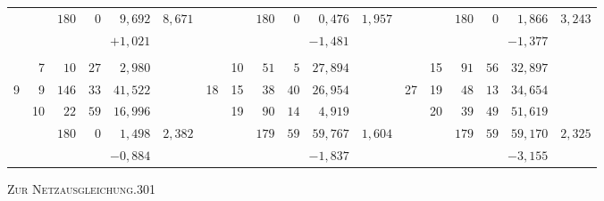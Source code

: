 \begin{center}
\begin{tabular}{|r|r|r@{\;}r@{\;}r|r||r|r|r@{\;}r@{\;}r|r||r|r|r@{\;}r@{\;}r|r|}
 & \llap{\raisebox{.5ex}{.}\hspace{.4em}} & $180$ & $0$ & $9{,}692$ & $8{,}671$ &  &  & $180$ & $0$ & $0{,}476$ & $1{,}957$ &  &  & $180$ & $0$ & $1{,}866$ & $3{,}243$\\
 &  & \multicolumn{3}{r|}{$+1{,}021$} &  &  &  & \multicolumn{3}{r|}{$-1{,}481$} &  &  &  & \multicolumn{3}{r|}{$-1{,}377$} & \\
 &  &  &  &  &  &  &  &  &  &  &  &  &  &  &  &  & \\
 & 7 & $10$ & $27$ & $2{,}980$ &  &  & 10 & $51$ & $5$ & $27{,}894$ &  &  & 15 & $91$ & $56$ & $32{,}897$ & \\
9 & 9 & $146$ & $33$ & $41{,}522$ &  & 18 & 15 & $38$ & $40$ & $26{,}954$ &  & 27 & 19 & $48$ & $13$ & $34{,}654$ & \\
 & 10 & $22$ & $59$ & $16{,}996$ &  &  & 19 & $90$ & $14$ & $4{,}919$ &  &  & 20 & $39$ & $49$ & $51{,}619$ & \\
\cline{3-5}\cline{9-11}\cline{15-17}
 &  & $180$ & $0$ & $1{,}498$ & $2{,}382$ &  &  & $179$ & $59$ & $59{,}767$ & $1{,}604$ &  &  & $179$ & $59$ & $59{,}170$ & $2{,}325$\\
 &  & \multicolumn{3}{r|}{$-0{,}884$} &  &  &  & \multicolumn{3}{r|}{$-1{,}837$} &  &  &  & \multicolumn{3}{r|}{$-3{,}155$} & \\
\end{tabular}
\endgroup
\end{center}
\noindent\hspace*{10cm}\raisebox{.4ex}{\scriptsize--}
\clearpage
\noindent\mbox{}\hfill\textsc{Zur Netzausgleichung.}\hfill301\par\medskip
